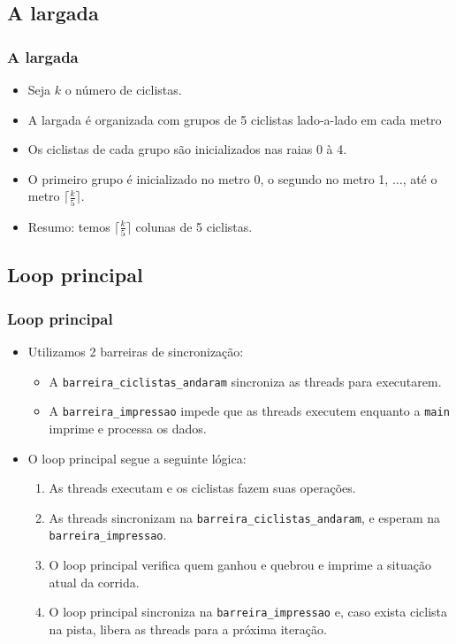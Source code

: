 \documentclass{beamer}
\begin{document}
\subsection{A largada}
\begin{frame}
  \frametitle{A largada}
  \begin{itemize}
    \item Seja $k$ o número de ciclistas.
    \item A largada é organizada com grupos de 5 ciclistas lado-a-lado em cada metro
    \item Os ciclistas de cada grupo são inicializados nas raias 0 à 4.
    \item O primeiro grupo é inicializado no metro 0, o segundo no metro 1, $\dots$, até o metro $\lceil\frac{k}{5}\rceil$.
    \item Resumo: temos $\lceil\frac{k}{5}\rceil$ colunas de 5 ciclistas.
  \end{itemize}
\end{frame}

\subsection{Loop principal}
\begin{frame}
  \frametitle{Loop principal}
  \begin{itemize}
    \item Utilizamos 2 barreiras de sincronização:
    \begin{itemize}
      \item A \texttt{barreira\_ciclistas\_andaram} sincroniza as threads para executarem.
      \item A \texttt{barreira\_impressao} impede que as threads executem enquanto a \texttt{main} imprime e processa os dados.
    \end{itemize}
    \item O loop principal segue a seguinte lógica:
    \begin{enumerate}
      \item As threads executam e os ciclistas fazem suas operações.
      \item As threads sincronizam na \texttt{barreira\_ciclistas\_andaram}, e esperam na \texttt{barreira\_impressao}.
      \item O loop principal verifica quem ganhou e quebrou e imprime a situação atual da corrida.
      \item O loop principal sincroniza na \texttt{barreira\_impressao} e, caso exista ciclista na pista, libera as threads para a próxima iteração.
    \end{enumerate}
  \end{itemize}
\end{frame}
\end{document}
